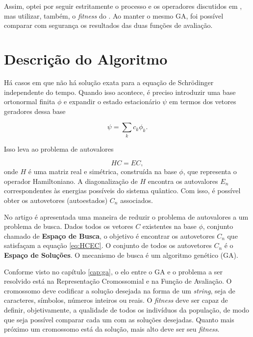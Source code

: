 	Assim, optei por seguir estritamente o processo e os operadores discutidos em \cite{metodo2004}, mas utilizar, também, o \emph{fitness} do \cite{metodo2011}. Ao manter o mesmo GA, foi possível comparar com segurança os resultados das duas funções de avaliação.

\section{Descrição do Algoritmo}

	Há casos em que não há solução exata para a equação de Schrödinger independente do tempo. Quando isso acontece, é preciso introduzir uma base ortonormal finita {$\phi$} e expandir o estado estacionário $\psi$ em termos dos vetores geradores dessa base
	
	\begin{equation}
		\psi = \sum_k c_k \phi_k.
	\end{equation}
	
	Isso leva ao problema de autovalores
	
	\begin{equation}\label{eq:HCEC}
		HC = EC,
	\end{equation}
	onde $H$ é uma matriz real e simétrica, construída na base ${\phi}$, que representa o operador Hamiltoniano. A diagonalização de $H$ encontra os autovalores $E_n$ correspondentes às energias possíveis do sistema quântico. Com isso, é possível obter os autovetores (autoestados) $C_n$ associados.
	
	No artigo \cite{metodo2004} é apresentada uma maneira de reduzir o problema de autovalores a um problema de busca. Dados todos os vetores $C$ existentes na base $\phi$, conjunto chamado de \textbf{Espaço de Busca}, o objetivo é encontrar os autovetores $C_n$ que satisfaçam a equação \ref{eq:HCEC}. O conjunto de todos os autovetores $C_n$ é o \textbf{Espaço de Soluções}. O mecanismo de busca é um algoritmo genético (GA).
	
	Conforme visto no capítulo \ref{cap:ga}, o elo entre o GA e o problema a ser resolvido está na Representação Cromossomial e na Função de Avaliação. O cromossomo deve codificar a solução desejada na forma de um \emph{string}, seja de caracteres, símbolos, números inteiros ou reais. O \emph{fitness} deve ser capaz de definir, objetivamente, a qualidade de todos os indivíduos da população, de modo que seja possível comparar cada um com as soluções desejadas. Quanto mais próximo um cromossomo está da solução, mais alto deve ser seu \emph{fitness}.

